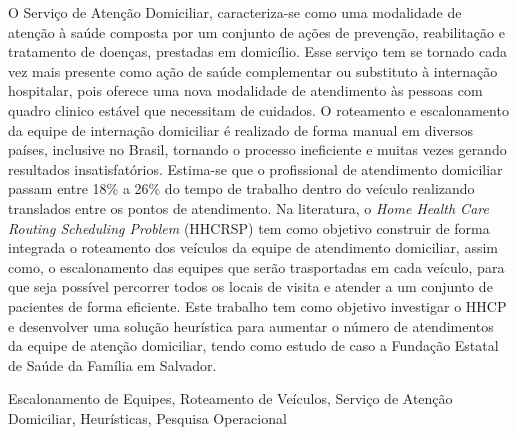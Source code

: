 
\resumo
O Serviço de Atenção Domiciliar, caracteriza-se como uma modalidade de atenção à saúde composta por um conjunto de ações de prevenção, reabilitação e tratamento de doenças, prestadas em domicílio. Esse serviço tem se tornado cada vez mais presente como ação de saúde complementar ou substituto à internação hospitalar, pois oferece uma nova modalidade de atendimento às pessoas com quadro clinico estável que necessitam de cuidados. O roteamento e escalonamento da equipe de internação domiciliar é realizado de forma manual em diversos países, inclusive no Brasil, tornando o processo ineficiente e muitas vezes gerando resultados insatisfatórios. Estima-se que o profissional de atendimento domiciliar passam entre 18\% a 26\% do tempo de trabalho dentro do veículo realizando translados entre os pontos de atendimento. Na literatura, o \textit{Home Health Care Routing Scheduling Problem} (HHCRSP) tem como objetivo construir de forma integrada o roteamento dos veículos da equipe de atendimento domiciliar, assim como, o escalonamento das equipes que serão trasportadas em cada veículo, para que seja possível percorrer todos os locais de visita e atender a um conjunto de pacientes de forma eficiente. Este trabalho tem como objetivo investigar o HHCP e desenvolver uma solução heurística para aumentar o número de atendimentos da equipe de atenção domiciliar, tendo como estudo de caso a Fundação Estatal de Saúde da Família em Salvador.
\begin{keywords}
Escalonamento de Equipes, Roteamento de Veículos, Serviço de Atenção Domiciliar, Heurísticas, Pesquisa Operacional
\end{keywords}


